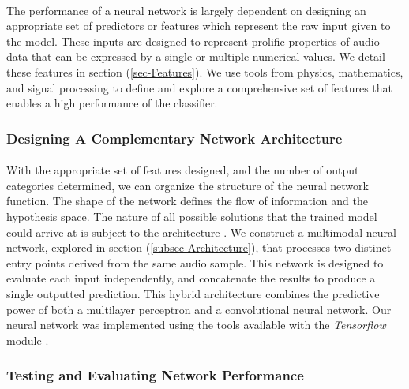 \documentclass[12pt,letterpaper]{article}
\begin{document}
\paragraph*{}The performance of a neural network is largely dependent on designing an appropriate set of predictors or features which represent the raw input given to the model. These inputs are designed to represent prolific properties of audio data that can be expressed by a single or multiple numerical values. We detail these features in section (\ref{sec-Features}). We use tools from physics, mathematics, and signal processing to define and explore a comprehensive set of features that enables a high performance of the classifier. 


\subsubsection{Designing A Complementary Network Architecture}

\paragraph*{}With the appropriate set of features designed, and the number of output categories determined, we can organize the structure of the neural network function. The shape of the network defines the flow of information and the hypothesis space. The nature of all possible solutions that the trained model could arrive at is subject to the architecture \cite{Goodfellow}. We construct a multimodal neural network, explored in section (\ref{subsec-Architecture}), that processes two distinct entry points derived from the same audio sample. This network is designed to evaluate each input independently, and concatenate the results to produce a single outputted prediction. This hybrid architecture combines the predictive power of both a multilayer perceptron and a convolutional neural network. Our neural network was implemented using the tools available with the \textit{Tensorflow} module \cite{Tensorflow}.


\subsubsection{Testing and Evaluating Network Performance}
\end{document}

